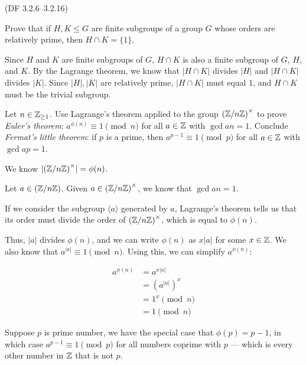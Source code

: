 \begin{problem}{(\textsf{DF 3.2.6--3.2.16})}
  \begin{enumalph}
    \item Prove that if $H,K \leq G$ are finite subgroups
    of a group $G$ whose orders are relatively prime,
    then $H \cap K=\{1\}$.
    \begin{Answer}
      Since $H$ and $K$ are finite subgroups of $G$, $H \cap K$ is also a finite subgroup
      of $G$, $H$, and $K$.
      By the Lagrange theorem, we know that $|H \cap K|$ divides $|H|$
      and $|H \cap K|$ divides $|K|$.
      Since $|H|,|K|$ are relatively prime, $|H \cap K|$ must equal $1$,
      and $H \cap K$ must be the trivial subgroup.
    \end{Answer}

    \item Let $n \in \mathbb{Z}_{\geq 1}$.  Use Lagrange's theorem applied to the group
    ${(\mathbb{Z}/n\mathbb{Z})}^\times$ to prove \emph{Euler's theorem}:
    $a^{\phi(n)} \equiv 1 \pmod{n}$ for all
    $a \in \mathbb{Z}$ with $\gcd{a}{n}=1$.  Conclude \emph{Fermat's little theorem}: if $p$ is 
    a prime, then $a^{p-1} \equiv 1 \pmod{p}$ for all $a \in \mathbb{Z}$ with $\gcd{a}{p}=1$.
    \begin{Answer}
      We know $|{(\mathbb{Z}/n\mathbb{Z})}^\times | = \phi(n)$.
      
      \noindent
      Let $a \in {(\mathbb{Z}/n\mathbb{Z})}$. Given $a \in {(\mathbb{Z}/n\mathbb{Z})}^\times$,
      we know that $\gcd{a}{n}=1$.

      If we consider the subgroup $\langle a \rangle$ generated by $a$,
      Lagrange's theorem tells us that its order must divide
      the order of ${(\mathbb{Z}/n\mathbb{Z})}^\times$, which is equal to $\phi(n)$.
      
      Thus, $|a|$ divides $\phi(n)$, and we can write $\phi(n)$ as $x|a|$ for some $x \in \mathbb{Z}$.
      We also know that $a^{|a|} \equiv 1 \pmod{n}$. Using this, we can simplify $a^{\phi(n)}$:

      \begin{align*}
        a^{\phi(n)} &= a^{x|a|} \\
                    &= {(a^{|a|})}^x \\
                    &= 1^x \pmod{n} \\
                    &= 1 \pmod{n}
      \end{align*}

      
      Suppose $p$ is prime number,
      we have the special case that $\phi(p) = p-1$,
      in which case $a^{p-1} \equiv 1 \pmod{p}$
      for all numbers coprime with $p$ --- which
      is every other number in $\mathbb{Z}$ that is not $p$.  
    \end{Answer}
  \end{enumalph}
\end{problem}

